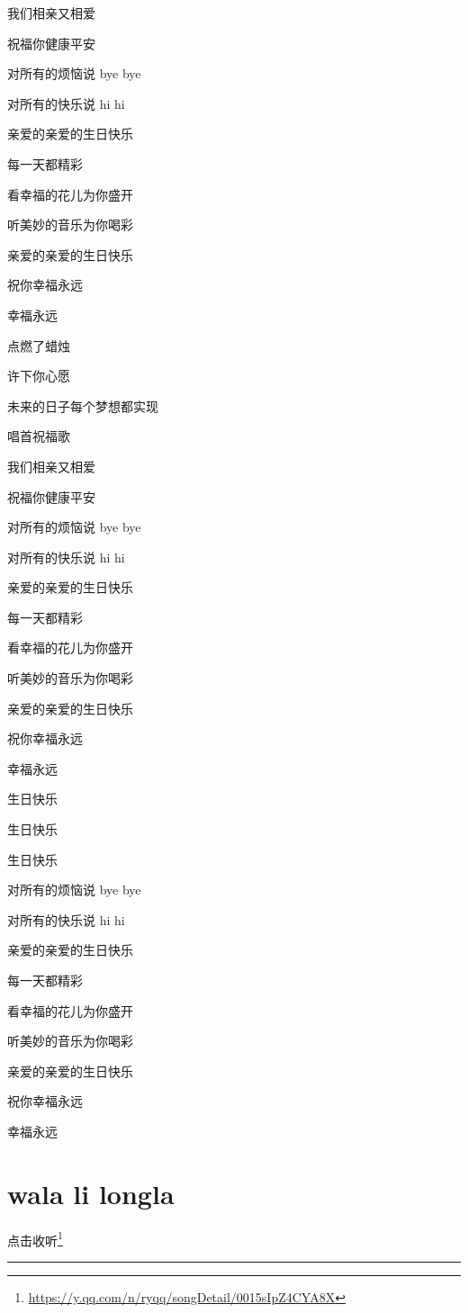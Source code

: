\documentclass[]{ctexbook}
\renewcommand{\href}[2]{#2\footnote{\url{#1}}}
\begin{document}
我们相亲又相爱

祝福你健康平安

对所有的烦恼说 bye bye

对所有的快乐说 hi hi

亲爱的亲爱的生日快乐

每一天都精彩

看幸福的花儿为你盛开

听美妙的音乐为你喝彩

亲爱的亲爱的生日快乐

祝你幸福永远

幸福永远

点燃了蜡烛

许下你心愿

未来的日子每个梦想都实现

唱首祝福歌

我们相亲又相爱

祝福你健康平安

对所有的烦恼说 bye bye

对所有的快乐说 hi hi

亲爱的亲爱的生日快乐

每一天都精彩

看幸福的花儿为你盛开

听美妙的音乐为你喝彩

亲爱的亲爱的生日快乐

祝你幸福永远

幸福永远

生日快乐

生日快乐

生日快乐

对所有的烦恼说 bye bye

对所有的快乐说 hi hi

亲爱的亲爱的生日快乐

每一天都精彩

看幸福的花儿为你盛开

听美妙的音乐为你喝彩

亲爱的亲爱的生日快乐

祝你幸福永远

幸福永远

\section*{wala li longla}\label{wala-li-longla}


\href{https://y.qq.com/n/ryqq/songDetail/0015sIpZ4CYA8X}{点击收听}

\begin{center}\rule{0.5\linewidth}{0.5pt}\end{center}
\end{document}
